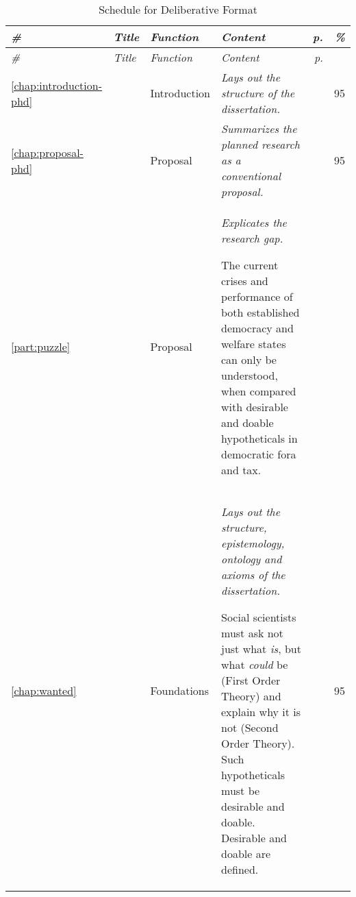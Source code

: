 
\begin{longtabu}
	{lp{3cm}
	p{2cm}
	p{5cm}
	r
	r} 

\caption{Schedule for Deliberative Format\label{tab:schedule}}\\

	\toprule 
	
	\emph{\#} 
	&\emph{Title} 
	&\emph{Function} 
	&\emph{Content}	
	&\emph{p.}
	&\emph{\%}
	\\  
	
	\midrule 
	
\endfirsthead 		

	\toprule
	
	\emph{\#} 
	&\emph{Title}
	&\emph{Function}
	&\emph{Content}
	&\emph{p.} 
	&
	\\ 

	\midrule 

\endhead

\small

\ref{chap:introduction-phd}
&	
&	Introduction
&	\emph{Lays out the structure of the dissertation.}

&	\pageref{chap:introduction-phd}
& 95
\\

\ref{chap:proposal-phd}
&	
&	Proposal
&	\emph{Summarizes the planned research as a conventional proposal.}

&	\pageref{chap:introduction-phd}
& 95
\\


\ref{part:puzzle}	
&	
&	Proposal	
&	\emph{Explicates the research gap.} 

	The current crises and performance of both established democracy and welfare states can only be understood, when compared with desirable and doable hypotheticals in democratic fora and tax. 
&	\pageref{part:puzzle}
\\

\ref{chap:wanted}
&	
&	Foundations
&	\emph{Lays out the structure, epistemology, ontology and axioms of the dissertation.}
 
	Social scientists must ask not just what \emph{is}, but what \emph{could} be (First Order Theory) and explain why it is not (Second Order Theory). 
	Such hypotheticals must be desirable and doable. Desirable and doable are defined. 
&	\pageref{chap:wanted}
& 95
\\



\end{longtabu}
